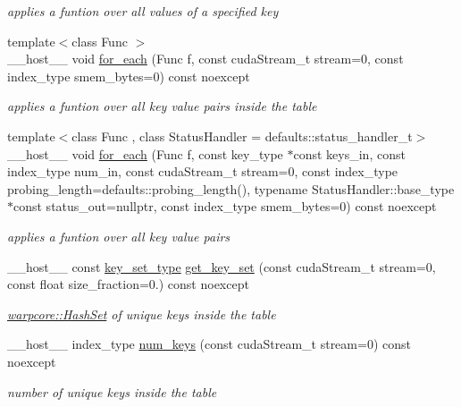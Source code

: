 \begin{DoxyCompactItemize}
\begin{DoxyCompactList}\small\item\em applies a funtion over all values of a specified key \end{DoxyCompactList}\item 
{\footnotesize template$<$class Func $>$ }\\\+\_\+\+\_\+host\+\_\+\+\_\+ void \hyperlink{classwarpcore_1_1MultiValueHashTable_a7df6d6258352372a39ce16ea79c368ae}{for\+\_\+each} (Func f, const cuda\+Stream\+\_\+t stream=0, const index\+\_\+type smem\+\_\+bytes=0) const noexcept
\begin{DoxyCompactList}\small\item\em applies a funtion over all key value pairs inside the table \end{DoxyCompactList}\item 
{\footnotesize template$<$class Func , class Status\+Handler  = defaults\+::status\+\_\+handler\+\_\+t$>$ }\\\+\_\+\+\_\+host\+\_\+\+\_\+ void \hyperlink{classwarpcore_1_1MultiValueHashTable_ab0b0fabd71a8937fca8c790b2a4864ee}{for\+\_\+each} (Func f, const key\+\_\+type $\ast$const keys\+\_\+in, const index\+\_\+type num\+\_\+in, const cuda\+Stream\+\_\+t stream=0, const index\+\_\+type probing\+\_\+length=defaults\+::probing\+\_\+length(), typename Status\+Handler\+::base\+\_\+type $\ast$const status\+\_\+out=nullptr, const index\+\_\+type smem\+\_\+bytes=0) const noexcept
\begin{DoxyCompactList}\small\item\em applies a funtion over all key value pairs \end{DoxyCompactList}\item 
\+\_\+\+\_\+host\+\_\+\+\_\+ const \hyperlink{classwarpcore_1_1HashSet}{key\+\_\+set\+\_\+type} \hyperlink{classwarpcore_1_1MultiValueHashTable_ab52e7809d5581849e07b914d8ce4ef9f}{get\+\_\+key\+\_\+set} (const cuda\+Stream\+\_\+t stream=0, const float size\+\_\+fraction=0.) const noexcept
\begin{DoxyCompactList}\small\item\em {\ttfamily \hyperlink{classwarpcore_1_1HashSet}{warpcore\+::\+Hash\+Set}} of unique keys inside the table \end{DoxyCompactList}\item 
\+\_\+\+\_\+host\+\_\+\+\_\+ index\+\_\+type \hyperlink{classwarpcore_1_1MultiValueHashTable_aec537b17501127cd2bb44f60b90aecfa}{num\+\_\+keys} (const cuda\+Stream\+\_\+t stream=0) const noexcept
\begin{DoxyCompactList}\small\item\em number of unique keys inside the table \end{DoxyCompactList}\item 

\end{DoxyCompactItemize}
